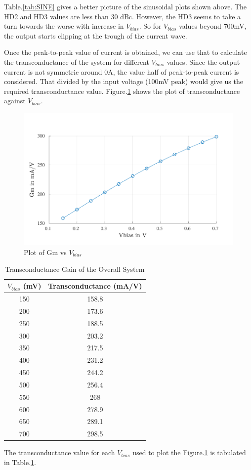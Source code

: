 Table.\ref{tab:SINE} gives a better picture of the sinusoidal plots shown above. The HD2 and HD3 values are less than 30 dBc. However, the HD3 seems to take a turn towards the worse with increase in $V_{bias}$. So for $V_{bias}$ values beyond 700mV, the output starts clipping at the trough of the current wave.

Once the peak-to-peak value of current is obtained, we can use that to calculate the transconductance of the system for different $V_{bias}$ values. Since the output current is not symmetric around 0A, the value half of peak-to-peak current is considered. That divided by the input voltage (100mV peak) would give us the required transconductance value. Figure.\ref{fig:GM} shows the plot of transconductance against $V_{bias}$.
\begin{figure} [H]
\centering
\includegraphics[scale=1]{Figures/Plots/Ov_Gm.pdf}
\caption{Plot of Gm vs $V_{bias}$}
\label{fig:GM}
\end{figure}

\begin{table} [H]
\centering
\begin{tabular}{@{}cc@{}}
\toprule
$V_{bias}$ (mV)			& Transconductance (mA/V)	\\ \midrule
150					& 158.8 \\
200					& 173.6 \\
250					& 188.5 \\
300					& 203.2 \\
350					& 217.5 \\
400					& 231.2 \\
450					& 244.2 \\
500					& 256.4 \\
550					& 268 \\
600					& 278.9 \\
650					& 289.1 \\
700 				& 298.5 \\
\bottomrule
\end{tabular}
\caption{Transconductance Gain of the Overall System}
\label{tab:GM}
\end{table}
The transconductance value for each $V_{bias}$ used to plot the Figure.\ref{fig:GM} is tabulated in Table.\ref{tab:GM}.

